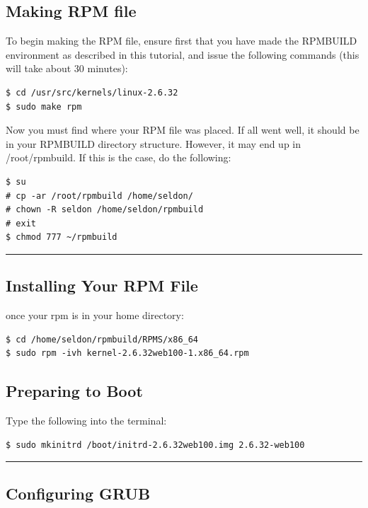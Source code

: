 \subsection{Making RPM file}
To begin making the RPM file, ensure first that you have made the RPMBUILD environment as described in this tutorial, and issue the following commands (this will take about 30 minutes):
\begin{snugshade}\begin{verbatim}
$ cd /usr/src/kernels/linux-2.6.32
$ sudo make rpm 
\end{verbatim}\end{snugshade}\noindent
Now you must find where your RPM file was placed. If all went well, it should be in your RPMBUILD directory structure. However, it may end up in /root/rpmbuild. If this is the case, do the following:
\begin{snugshade}\begin{verbatim}
$ su
# cp -ar /root/rpmbuild /home/seldon/
# chown -R seldon /home/seldon/rpmbuild
# exit
$ chmod 777 ~/rpmbuild
\end{verbatim}\end{snugshade}\noindent 

\hrule

\subsection{Installing Your RPM File}

once your rpm is in your home directory:
\begin{snugshade}\begin{verbatim}
$ cd /home/seldon/rpmbuild/RPMS/x86_64
$ sudo rpm -ivh kernel-2.6.32web100-1.x86_64.rpm
\end{verbatim}\end{snugshade}\noindent

\subsection{Preparing to Boot}
Type the following into the terminal: 
\begin{snugshade}\begin{verbatim}
$ sudo mkinitrd /boot/initrd-2.6.32web100.img 2.6.32-web100
\end{verbatim}\end{snugshade}\noindent

\hrule

\subsection{Configuring GRUB}

